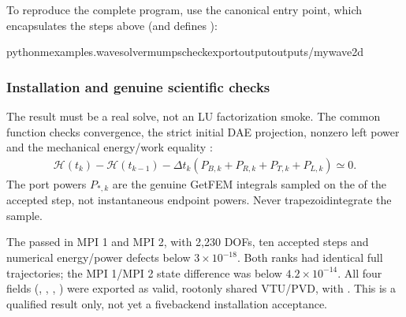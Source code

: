 \documentclass[letterpaper,10pt,english]{sphinxmanual}
\begin{document}
\sphinxAtStartPar
To reproduce the complete program, use the canonical
entry point, which encapsulates the steps above
(and defines ):

\begin{sphinxVerbatim}[commandchars=\\\{\}]
python\PYGZhy{}mexamples.wave\PYGZhy{}\PYGZhy{}solvermumps\PYGZhy{}\PYGZhy{}check\PYGZhy{}\PYGZhy{}export\PYGZhy{}\PYGZhy{}outputoutputs/my\PYGZus{}wave\PYGZus{}2d
\end{sphinxVerbatim}


\subsubsection{Installation and genuine scientific checks}
\label{\detokenize{examples/wave:installation-and-genuine-scientific-checks}}
\sphinxAtStartPar
The result must be a real  solve, not an LU
factorization smoke. The common 
function checks convergence, the strict initial DAE
projection, nonzero left power and the mechanical
energy/work equality :
\begin{equation*}
\begin{split}\mathcal H(t_k)-\mathcal H(t_{k-1})
-\Delta t_k\left(P_{B,k}+P_{R,k}+P_{T,k}+P_{L,k}\right)
\simeq 0.\end{split}
\end{equation*}
\sphinxAtStartPar
The port powers \(P_{\ast,k}\) are the genuine
 GetFEM integrals sampled on the  of the accepted step, not instantaneous endpoint
powers. Never trapezoid\sphinxhyphen{}integrate the  sample.

\sphinxAtStartPar
The  passed in MPI 1
and MPI 2, with 2,230 DOFs, ten accepted steps and
numerical energy/power defects below
\(3\times10^{-18}\). Both ranks had identical
full trajectories; the MPI 1/MPI 2 state difference
was below \(4.2\times10^{-14}\). All four
fields (, , , )
were exported as valid, root\sphinxhyphen{}only shared VTU/PVD,
with . This is a
qualified  result only, not yet
a five\sphinxhyphen{}backend installation acceptance.
\end{document}
